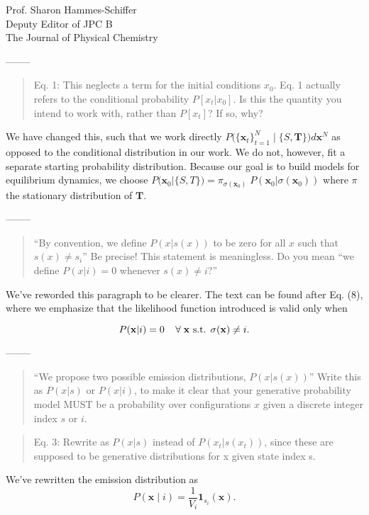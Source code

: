 \documentclass{letter}
\newcommand{\separate}{\begin{center}--------\end{center}}
\begin{document}
\begin{letter}{Prof. Sharon Hammes-Schiffer \\ Deputy Editor of JPC B \\ The Journal of Physical Chemistry}
\separate

\begin{quote}
Eq. 1: This neglects a term for the initial conditions $x_0$.  Eq. 1 actually refers to the conditional probability $P[{x_t}|x_0]$.  Is this the quantity you intend to work with, rather than $P[{x_t}]$?  If so, why?
\end{quote}

We have changed this, such that we work directly $P\big(\{\mathbf{x}_t\}_{t=1}^N\;\big|\; \{S, \mathbf{T}\}\big)d\mathbf{x}^N$ as opposed to the conditional distribution in our work. We do not, however, fit a separate starting probability distribution. Because our goal is to build models for equilibrium dynamics, we choose $P\big(\mathbf{x}_0 | \{S, T\}\big) = \pi_{\sigma(\mathbf{x}_0)} \; P(\mathbf{x}_0 | \sigma(\mathbf{x}_0))$ where $\pi$ the stationary distribution of $\mathbf{T}$.

\separate
\begin{quote}
``By convention, we define $P(x | s(x))$ to be zero for all $x$ such that $s(x) \ne s_i$'' Be precise!  This statement is meaningless.  Do you mean ``we define $P(x | i) = 0$ whenever $s(x)\ne i$?''
\end{quote}

We've reworded this paragraph to be clearer. The text can be found after Eq. (8), where we emphasize that the likelihood function introduced is valid only when

\begin{equation}
P(\mathbf{x} | i) = 0 \;\;\;\; \forall \; \mathbf{x} \textnormal{ s.t. } \sigma(\mathbf{x}) \neq i.
\end{equation}

\separate
\begin{quote}
``We propose two possible emission distributions, $P(x | s(x))$''  Write this as $P(x | s)$ or $P(x | i)$, to make it clear that your generative probability model MUST be a probability over configurations $x$ given a discrete integer index $s$ or $i$.
\end{quote}

\begin{quote}
Eq. 3: Rewrite as $P(x|s)$ instead of $P(x_t|s(x_t))$, since these are supposed to be generative distributions for x given state index s.
\end{quote}

We've rewritten the emission distribution as
\begin{equation}
P(\mathbf{x} \;|\; i) = \frac{1}{V_i} \mathbf{1}_{s_i}(\mathbf{x}).
\end{equation}


\end{letter}
\end{document}
